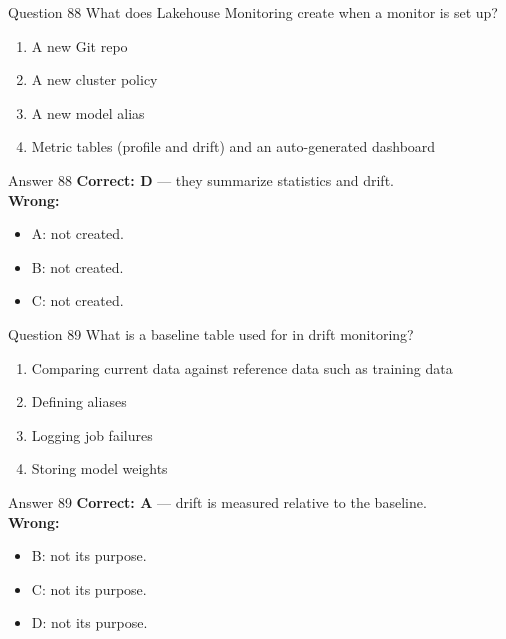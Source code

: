 \documentclass[aspectratio=169,11pt]{beamer}
\begin{document}
\begin{frame}{Question 88}
What does Lakehouse Monitoring create when a monitor is set up?
\begin{enumerate}[label=\Alph*.]
\item A new Git repo
\item A new cluster policy
\item A new model alias
\item Metric tables (profile and drift) and an auto-generated dashboard
\end{enumerate}
\end{frame}
\begin{frame}{Answer 88}
\textbf{Correct: D} --- they summarize statistics and drift.\\
\vspace{0.5em}
\textbf{Wrong:}
\begin{itemize}
\item A: not created.
\item B: not created.
\item C: not created.
\end{itemize}
\end{frame}

\begin{frame}{Question 89}
What is a baseline table used for in drift monitoring?
\begin{enumerate}[label=\Alph*.]
\item Comparing current data against reference data such as training data
\item Defining aliases
\item Logging job failures
\item Storing model weights
\end{enumerate}
\end{frame}
\begin{frame}{Answer 89}
\textbf{Correct: A} --- drift is measured relative to the baseline.\\
\vspace{0.5em}
\textbf{Wrong:}
\begin{itemize}
\item B: not its purpose.
\item C: not its purpose.
\item D: not its purpose.
\end{itemize}
\end{frame}
\end{document}
